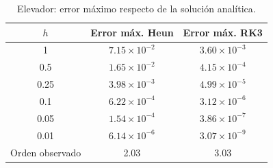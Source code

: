 \begin{table}[H]
\centering
\caption{Elevador: error máximo respecto de la solución analítica.}
\label{tab:elevador}
\begin{tabular}{ccc}
\toprule
$h$ & Error máx. Heun & Error máx. RK3 \\
\midrule
1 & $7.15\times10^{-2}$ & $3.60\times10^{-3}$ \\
0.5 & $1.65\times10^{-2}$ & $4.15\times10^{-4}$ \\
0.25 & $3.98\times10^{-3}$ & $4.99\times10^{-5}$ \\
0.1 & $6.22\times10^{-4}$ & $3.12\times10^{-6}$ \\
0.05 & $1.54\times10^{-4}$ & $3.86\times10^{-7}$ \\
0.01 & $6.14\times10^{-6}$ & $3.07\times10^{-9}$ \\
\midrule
Orden observado & 2.03 & 3.03 \\
\bottomrule
\end{tabular}
\end{table}

